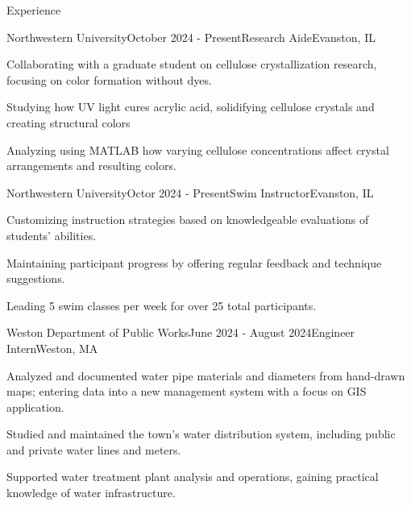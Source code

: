 \documentclass[
	a4paper, %
	11pt, %
]{resume} %
\begin{document}
\begin{rSection}{Experience}

	\begin{rSubsection}{Northwestern University}{October 2024 - Present}{Research Aide}{Evanston, IL}
		\item Collaborating with a graduate student on cellulose crystallization research, focusing on color formation without dyes.
		\item Studying how UV light cures acrylic acid, solidifying cellulose crystals and creating structural colors
		\item Analyzing using MATLAB how varying cellulose concentrations affect crystal arrangements and resulting colors.
	\end{rSubsection}


	\begin{rSubsection}{Northwestern University}{Octor 2024 - Present}{Swim Instructor}{Evanston, IL}
		\item Customizing instruction strategies based on knowledgeable evaluations of students' abilities.
		\item Maintaining participant progress by offering regular feedback and technique suggestions.
		\item Leading 5 swim classes per week for over 25 total participants.
	\end{rSubsection}


	\begin{rSubsection}{Weston Department of Public Works}{June 2024 - August 2024}{Engineer Intern}{Weston, MA}
		\item Analyzed and documented water pipe materials and diameters from hand-drawn maps; entering data into a new management system with a focus on GIS application.
		\item Studied and maintained the town’s water distribution system, including public and private water lines and meters.
		\item Supported water treatment plant analysis and operations, gaining practical knowledge of water infrastructure.
	\end{rSubsection}

\end{rSection}

\end{document}
